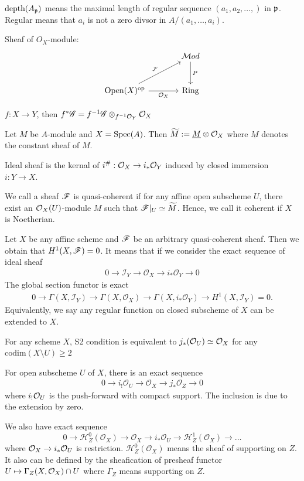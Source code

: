 {\np $\text{depth}(A_{\mathfrak{p}})$ means the maximal length of regular sequence $(a_1,a_2,\dots,)$ in $\mathfrak{p}$.
Regular means that $a_i$ is not a zero divsor in $A/(a_1,\dots,a_i)$.

\np Sheaf of $O_X$-module:
\[
\begin{tikzcd}[column sep=large, row sep=large]
& \mathcal{M}od \arrow[d, "P"] \\
\text{Open}(X)^{\text{op}} \arrow[ur, "\mathcal{F}"] \arrow[r, "\mathcal{O}_X"'] & \text{Ring}
\end{tikzcd}
\]

\np $f:X\to Y$, then $f^*\mathscr{G}  = f^{-1}\mathscr{G} \otimes_{f^{-1}\mathcal{O}_Y}\mathcal{O}_X $

\np Let $M$ be $A$-module and $X=\operatorname{Spec}(A)$. Then $\widetilde{M}:=\underline{M}\otimes \mathcal{O}_X$ where $\underline{M}$ denotes the constant sheaf of $M$.

\np Ideal sheaf is the kernal of $i^\#:\mathcal{O}_X\to i_*\mathcal{O}_Y$ induced by closed immersion $i:Y\to X$.

\np We call a sheaf $\mathscr{F}$ is quasi-coherent if for any affine open subscheme $U$, there exist an $\mathcal{O}_X(U)$-module $M$ such that $\mathscr{F}|_{U}\simeq \widetilde{M}$.
Hence, we call it coherent if $X$ is Noetherian.

\np Let $X$ be any affine scheme and $\mathscr{F}$ be an arbitrary quasi-coherent sheaf. Then we obtain that $H^1(X,\mathscr{F})=0$.
It means that if we consider the exact sequence of ideal sheaf 
\begin{align*}
    0 \to \mathcal{I}_Y \to \mathcal{O}_X \to i_* \mathcal{O}_Y \to 0
\end{align*}
The global section functor is exact 
\begin{align*}
    0 \to \Gamma(X, \mathcal{I}_Y) \to \Gamma(X, \mathcal{O}_X) \to \Gamma(X, i_* \mathcal{O}_Y)\to H^1(X, \mathcal{I}_Y) = 0.
\end{align*}
Equivalently, we say any regular function on closed subscheme of $X$ can be extended to $X$.

\np For any scheme $X$, S2 condition is equivalent to $j_*(\mathcal{O}_U)\simeq \mathcal{O}_X$ for any $\text{codim}(X\setminus U)\ge 2$

\np For open subscheme $U$ of $X$, there is an exact sequence
\begin{align*}
    0 \to i_! \mathcal{O}_U \to \mathcal{O}_X \to j_* \mathcal{O}_Z \to 0
\end{align*}
where $i_!\mathcal{O}_U$ is the push-forward with compact support. The inclusion is due to the extension by zero.

\np We also have exact sequence 
$$0 \to \mathcal{H}^0_Z(\mathcal{O}_X) \to \mathcal{O}_X \to i_* \mathcal{O}_U \to \mathcal{H}^1_Z(\mathcal{O}_X) \to \dots$$
where $\mathcal{O}_X\to i_*\mathcal{O}_U$ is restriction. $\mathcal{H}^0_Z(\mathcal{O}_X)$ means the sheaf of supporting on $Z$. 
It also can be defined by the sheafication of presheaf functor $U\mapsto \Gamma_{Z}(X,\mathcal{O}_X)\cap U$ where $\Gamma_Z$ means supporting on $Z$.

}
